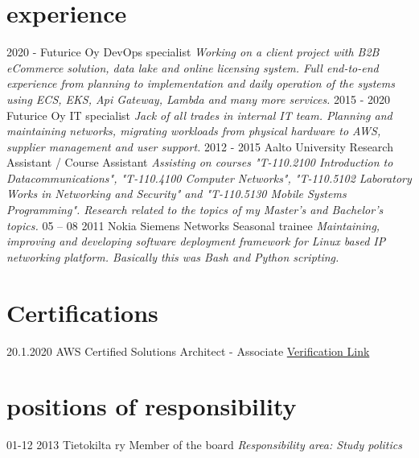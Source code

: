 \documentclass[]{friggeri-cv-a4}
\begin{document}
\section{experience}

\begin{entrylist}
    \entry
    {2020 - }
    {Futurice Oy}
    {DevOps specialist}
    {\emph{Working on a client project with B2B eCommerce solution, data lake and online licensing system. Full end-to-end experience from planning to implementation and daily operation of the systems using ECS, EKS, Api Gateway, Lambda and many more services.}}
  \entry
    {2015 - 2020}
    {Futurice Oy}
    {IT specialist}
    {\emph{Jack of all trades in internal IT team. Planning and maintaining networks, migrating workloads from physical hardware to AWS, supplier management and user support.}}
  \entry
    {2012 - 2015}
    {Aalto University}
    {Research Assistant / Course Assistant}
    {\emph{Assisting on courses "T-110.2100 Introduction to Datacommunications", "T-110.4100 Computer Networks", "T-110.5102 Laboratory Works in Networking and Security" and "T-110.5130 Mobile Systems Programming". Research related to the topics of my Master's and Bachelor's topics.}}
  \entry
    {05 – 08 2011}
    {Nokia Siemens Networks}
    {Seasonal trainee}
    {\emph{Maintaining, improving and developing software deployment framework for Linux based IP networking platform. Basically this was Bash and Python scripting.}}
\end{entrylist}

\section{Certifications}
  \begin{entrylist}
    \entry
      {20.1.2020}
      {AWS Certified Solutions Architect - Associate}
      {}
      {\href{https://www.credly.com/badges/1a48ceb8-1156-43b3-9385-4eaaa55743fc/linked_in_profile}{Verification Link}}
  \end{entrylist}

\section{positions of responsibility}
  \begin{entrylist}
    \entry
      {01-12 2013}
      {Tietokilta ry}
      {Member of the board}
      {\emph{Responsibility area: Study politics}}
  \end{entrylist}
\end{document}
